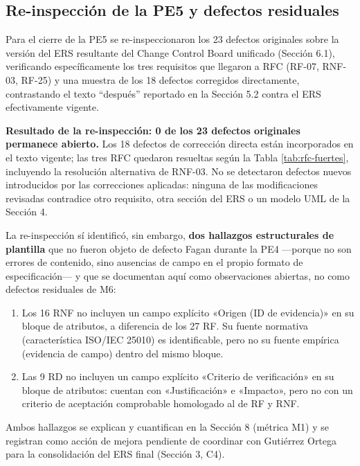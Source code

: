 \documentclass[journal,onecolumn]{IEEEtran}
\begin{document}
\subsection{Re-inspección de la PE5 y defectos residuales}

Para el cierre de la PE5 se re-inspeccionaron los 23 defectos originales sobre la versión del ERS resultante del Change Control Board unificado (Sección 6.1), verificando específicamente los tres requisitos que llegaron a RFC (RF-07, RNF-03, RF-25) y una muestra de los 18 defectos corregidos directamente, contrastando el texto ``después'' reportado en la Sección 5.2 contra el ERS efectivamente vigente.

\textbf{Resultado de la re-inspección: 0 de los 23 defectos originales permanece abierto.} Los 18 defectos de corrección directa están incorporados en el texto vigente; las tres RFC quedaron resueltas según la Tabla \ref{tab:rfc-fuertes}, incluyendo la resolución alternativa de RNF-03. No se detectaron defectos nuevos introducidos por las correcciones aplicadas: ninguna de las modificaciones revisadas contradice otro requisito, otra sección del ERS o un modelo UML de la Sección 4.

La re-inspección sí identificó, sin embargo, \textbf{dos hallazgos estructurales de plantilla} que no fueron objeto de defecto Fagan durante la PE4 ---porque no son errores de contenido, sino ausencias de campo en el propio formato de especificación--- y que se documentan aquí como observaciones abiertas, no como defectos residuales de M6:

\begin{enumerate}
	\item Los 16 RNF no incluyen un campo explícito «Origen (ID de evidencia)» en su bloque de atributos, a diferencia de los 27 RF. Su fuente normativa (característica ISO/IEC 25010) es identificable, pero no su fuente empírica (evidencia de campo) dentro del mismo bloque.
	\item Las 9 RD no incluyen un campo explícito «Criterio de verificación» en su bloque de atributos: cuentan con «Justificación» e «Impacto», pero no con un criterio de aceptación comprobable homologado al de RF y RNF.
\end{enumerate}

Ambos hallazgos se explican y cuantifican en la Sección 8 (métrica M1) y se registran como acción de mejora pendiente de coordinar con Gutiérrez Ortega para la consolidación del ERS final (Sección 3, C4).
	
	\newpage
	
\end{document}
